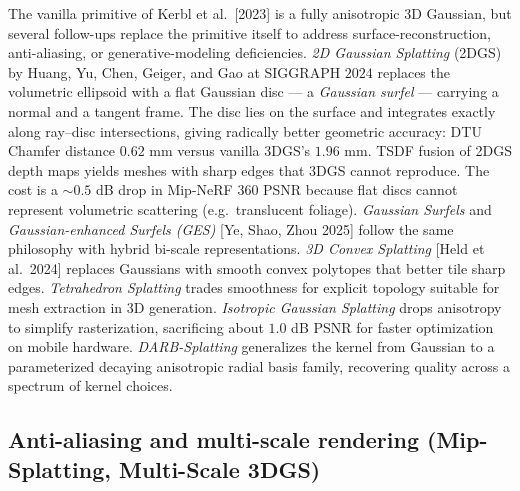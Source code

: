 \documentclass{article}
\begin{document}
The vanilla primitive of Kerbl et al.~{[}2023{]} is a fully anisotropic 3D Gaussian, but several follow-ups replace the primitive itself to address surface-reconstruction, anti-aliasing, or generative-modeling deficiencies. \emph{2D Gaussian Splatting} (2DGS) by Huang, Yu, Chen, Geiger, and Gao at SIGGRAPH \(2024\) \cite{huang20242dgaussiansplattin} replaces the volumetric ellipsoid with a flat Gaussian disc --- a \emph{Gaussian surfel} --- carrying a normal and a tangent frame. The disc lies on the surface and integrates exactly along ray--disc intersections, giving radically better geometric accuracy: DTU Chamfer distance \(0.62\) mm versus vanilla 3DGS's \(1.96\) mm. TSDF fusion of 2DGS depth maps yields meshes with sharp edges that 3DGS cannot reproduce. The cost is a \(\sim\!0.5\) dB drop in Mip-NeRF 360 PSNR because flat discs cannot represent volumetric scattering (e.g.~translucent foliage). \emph{Gaussian Surfels} and \emph{Gaussian-enhanced Surfels (GES)} {[}Ye, Shao, Zhou 2025{]} follow the same philosophy with hybrid bi-scale representations. \emph{3D Convex Splatting} {[}Held et al.~2024{]} replaces Gaussians with smooth convex polytopes that better tile sharp edges. \emph{Tetrahedron Splatting} \cite{gu2024tetrahedronsplatti} trades smoothness for explicit topology suitable for mesh extraction in 3D generation. \emph{Isotropic Gaussian Splatting} \cite{gong2024isotropicgaussians} drops anisotropy to simplify rasterization, sacrificing about \(1.0\) dB PSNR for faster optimization on mobile hardware. \emph{DARB-Splatting} \cite{pramuditha2025darbsplattinggener} generalizes the kernel from Gaussian to a parameterized decaying anisotropic radial basis family, recovering quality across a spectrum of kernel choices.

\subsection{Anti-aliasing and multi-scale rendering (Mip-Splatting, Multi-Scale 3DGS)}\label{anti-aliasing-and-multi-scale-rendering-mip-splatting-multi-scale-3dgs}
\end{document}
